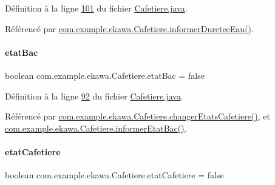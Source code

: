 Définition à la ligne \hyperlink{_cafetiere_8java_source_l00101}{101} du fichier \hyperlink{_cafetiere_8java_source}{Cafetiere.\+java}.



Référencé par \hyperlink{_cafetiere_8java_source_l00378}{com.\+example.\+ekawa.\+Cafetiere.\+informer\+Duretee\+Eau()}.

\mbox{\label{classcom_1_1example_1_1ekawa_1_1_cafetiere_a058f7a18cd9c0567d583b8bc6250d143}} 
\paragraph{\texorpdfstring{etat\+Bac}{etatBac}}
{\footnotesize\ttfamily boolean com.\+example.\+ekawa.\+Cafetiere.\+etat\+Bac = false\hspace{0.3cm}{\ttfamily [private]}}



Définition à la ligne \hyperlink{_cafetiere_8java_source_l00092}{92} du fichier \hyperlink{_cafetiere_8java_source}{Cafetiere.\+java}.



Référencé par \hyperlink{_cafetiere_8java_source_l00636}{com.\+example.\+ekawa.\+Cafetiere.\+changer\+Etats\+Cafetiere()}, et \hyperlink{_cafetiere_8java_source_l00295}{com.\+example.\+ekawa.\+Cafetiere.\+informer\+Etat\+Bac()}.

\mbox{\label{classcom_1_1example_1_1ekawa_1_1_cafetiere_ae170dd018d1e740b3bda080d1cc3d900}} 
\paragraph{\texorpdfstring{etat\+Cafetiere}{etatCafetiere}}
{\footnotesize\ttfamily boolean com.\+example.\+ekawa.\+Cafetiere.\+etat\+Cafetiere = false\hspace{0.3cm}{\ttfamily [private]}}



